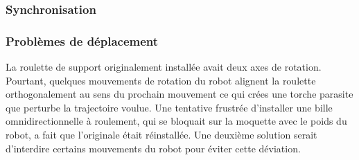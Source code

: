 \subsubsection{Synchronisation}

\subsubsection{Problèmes de déplacement}

La roulette de support originalement installée avait deux axes de
rotation. Pourtant, quelques mouvements de rotation du robot alignent
la roulette orthogonalement au sens du prochain mouvement ce qui crées
une torche parasite que perturbe la trajectoire voulue. Une tentative
frustrée d'installer une bille omnidirectionnelle à roulement, qui se
bloquait sur la moquette avec le poids du robot, a fait que
l'originale était réinstallée. Une deuxième solution serait d'interdire
certains mouvements du robot pour éviter cette déviation.